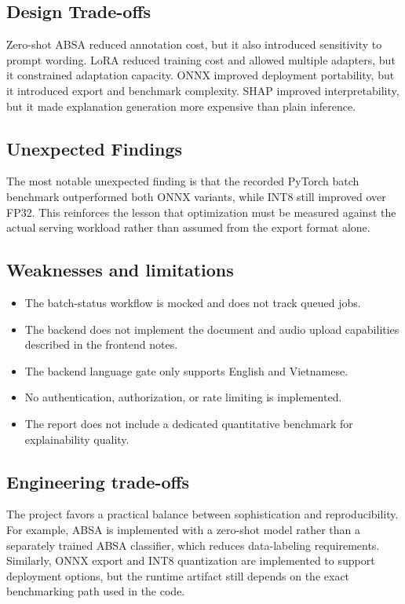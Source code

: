 \documentclass[12pt, a4paper]{article}
\begin{document}
\subsection{Design Trade-offs}
Zero-shot ABSA reduced annotation cost, but it also introduced sensitivity to prompt wording. LoRA reduced training cost and allowed multiple adapters, but it constrained adaptation capacity. ONNX improved deployment portability, but it introduced export and benchmark complexity. SHAP improved interpretability, but it made explanation generation more expensive than plain inference.

\subsection{Unexpected Findings}
The most notable unexpected finding is that the recorded PyTorch batch benchmark outperformed both ONNX variants, while INT8 still improved over FP32. This reinforces the lesson that optimization must be measured against the actual serving workload rather than assumed from the export format alone.

\subsection{Weaknesses and limitations}
\begin{itemize}[noitemsep]
  \item The batch-status workflow is mocked and does not track queued jobs.
  \item The backend does not implement the document and audio upload capabilities described in the frontend notes.
  \item The backend language gate only supports English and Vietnamese.
  \item No authentication, authorization, or rate limiting is implemented.
  \item The report does not include a dedicated quantitative benchmark for explainability quality.
\end{itemize}

\subsection{Engineering trade-offs}
The project favors a practical balance between sophistication and reproducibility. For example, ABSA is implemented with a zero-shot model rather than a separately trained ABSA classifier, which reduces data-labeling requirements. Similarly, ONNX export and INT8 quantization are implemented to support deployment options, but the runtime artifact still depends on the exact benchmarking path used in the code.
\end{document}
